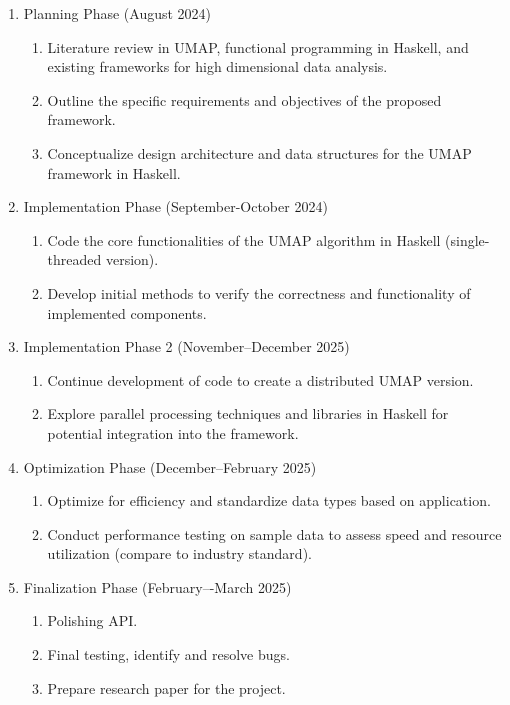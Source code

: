 \documentclass[11pt,letterpaper]{article}
\providecommand{\tightlist}{%
  \setlength{\itemsep}{0pt}\setlength{\parskip}{0pt}}
\begin{document}
\begin{enumerate}
  \tightlist
    \item Planning Phase (August 2024)
\begin{enumerate} \tightlist
    \item Literature review in UMAP, functional programming in Haskell, and existing frameworks for high dimensional data analysis.
    \item Outline the specific requirements and objectives of the proposed framework.
    \item Conceptualize design architecture and data structures for the UMAP framework in Haskell.
\end{enumerate}
\item Implementation Phase (September-October 2024)
\begin{enumerate} \tightlist
    \item Code the core functionalities of the UMAP algorithm in Haskell (single-threaded version).
    \item Develop initial methods to verify the correctness and functionality of implemented components.
\end{enumerate}
\item Implementation Phase 2 (November--December 2025)
\begin{enumerate} \tightlist
    \item Continue development of code to create a distributed UMAP version.
    \item Explore parallel processing techniques and libraries in Haskell for potential integration into the framework.
\end{enumerate}
\item Optimization Phase (December--February 2025)
\begin{enumerate} \tightlist
    \item Optimize for efficiency and standardize data types based on application.
    \item Conduct performance testing on sample data to assess speed and resource utilization (compare to industry standard).
\end{enumerate}
\item Finalization Phase (February–-March 2025)
\begin{enumerate} \tightlist
    \item Polishing API.
    \item Final testing, identify and resolve bugs.
    \item Prepare research paper for the project.
\end{enumerate}
\end{enumerate}
\end{document}

